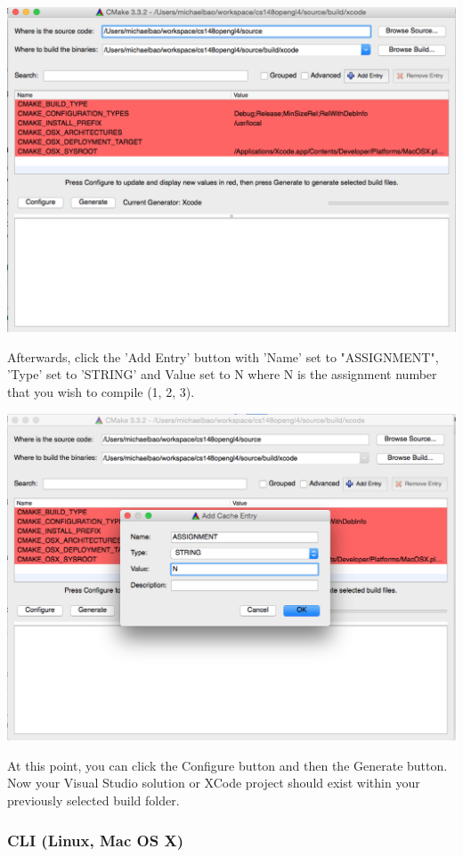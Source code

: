 \documentclass{article}
\begin{document}
\includegraphics[width=\linewidth]{cmake1.png}

Afterwards, click the 'Add Entry' button with 'Name' set to "ASSIGNMENT", 'Type' set to 'STRING' and Value set to N where N is the assignment number that you wish to compile (1, 2, 3).

\includegraphics[width=\linewidth]{cmake2.png}

At this point, you can click the Configure button and then the Generate button. Now your Visual Studio solution or XCode project should exist within your previously selected build folder.

\subsubsection*{CLI (Linux, Mac OS X)}
\end{document}
